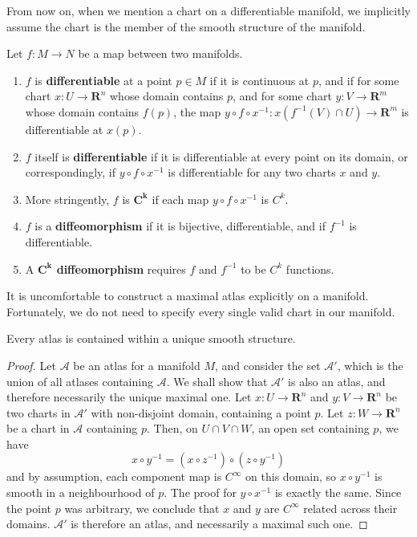 From now on, when we mention a chart on a differentiable manifold, we implicitly assume the chart is the member of the smooth structure of the manifold.

\begin{definition}
    Let $f:M \to N$ be a map between two manifolds.
    \begin{enumerate}
        \item $f$ is {\bf differentiable} at a point $p \in M$ if it is continuous at $p$, and if for some chart $x:U \to \mathbf{R}^n$ whose domain contains $p$, and for some chart $y:V \to \mathbf{R}^m$ whose domain contains $f(p)$, the map $y \circ f \circ x^{-1}:x(f^{-1}(V) \cap U) \to \mathbf{R}^m$ is differentiable at $x(p)$.
        \item $f$ itself is {\bf differentiable} if it is differentiable at every point on its domain, or correspondingly, if $y \circ f \circ x^{-1}$ is differentiable for any two charts $x$ and $y$.
        \item More stringently, $f$ is $\mathbf{C^k}$ if each map $y \circ f \circ x^{-1}$ is $C^k$.
        \item $f$ is a {\bf diffeomorphism} if it is bijective, differentiable, and if $f^{-1}$ is differentiable.
        \item A {\bf $\mathbf{C^k}$ diffeomorphism} requires $f$ and $f^{-1}$ to be $C^k$ functions.
    \end{enumerate}
\end{definition}

It is uncomfortable to construct a maximal atlas explicitly on a manifold. Fortunately, we do not need to specify every single valid chart in our manifold.

\begin{lemma}
    Every atlas is contained within a unique smooth structure.
\end{lemma}
\begin{proof}
Let $\mathcal{A}$ be an atlas for a manifold $M$, and consider the set $\mathcal{A}'$, which is the union of all atlases containing $\mathcal{A}$. We shall show that $\mathcal{A}'$ is also an atlas, and therefore necessarily the unique maximal one. Let $x:U \to \mathbf{R}^n$ and $y:V \to \mathbf{R}^n$ be two charts in $\mathcal{A}'$ with non-disjoint domain, containing a point $p$. Let $z:W \to \mathbf{R}^n$ be a chart in $\mathcal{A}$ containing $p$. Then, on $U \cap V \cap W$, an open set containing $p$, we have
%
\[ x \circ y^{-1} = (x \circ z^{-1}) \circ (z \circ y^{-1}) \]
%
and by assumption, each component map is $C^\infty$ on this domain, so $x \circ y^{-1}$ is smooth in a neighbourhood of $p$. The proof for $y \circ x^{-1}$ is exactly the same. Since the point $p$ was arbitrary, we conclude that $x$ and $y$ are $C^\infty$ related across their domains. $\mathcal{A}'$ is therefore an atlas, and necessarily a maximal such one.
\end{proof}

